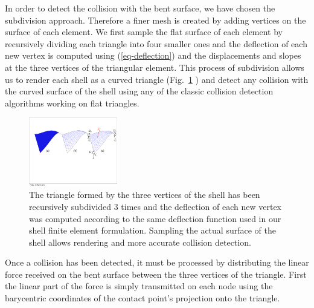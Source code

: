 \documentclass{llncs}
\begin{document}
In order to detect the collision with the bent surface, we have chosen the subdivision approach. Therefore a finer mesh is created by adding vertices on the surface of each element. We first sample the flat surface of each element by recursively dividing each triangle into four smaller ones and the deflection of each new vertex is computed using (\ref{eq-deflection}) and the displacements and slopes at the three vertices of the triangular element. This process of subdivision allows us to render each shell as a curved triangle (Fig.~\ref{fig-shell} ) and detect any collision with the curved surface of the shell using any of the classic collision detection algorithms working on flat triangles.
\begin{figure}
\centering
\includegraphics[height=3cm]{images/shell_curvature}
\caption {The triangle formed by the three vertices of the shell has been recursively subdivided 3 times and the deflection of each new vertex was computed according to the same deflection function used in our shell finite element formulation. Sampling the actual surface of the shell allows rendering and more accurate collision detection.}
\label{fig-shell}
\end{figure}

Once a collision has been detected, it must be processed by distributing the linear force received on the bent surface between the three vertices of the triangle. First the linear part of the force is simply transmitted on each node using the barycentric coordinates of the contact point's projection onto the triangle. 
\end{document}
